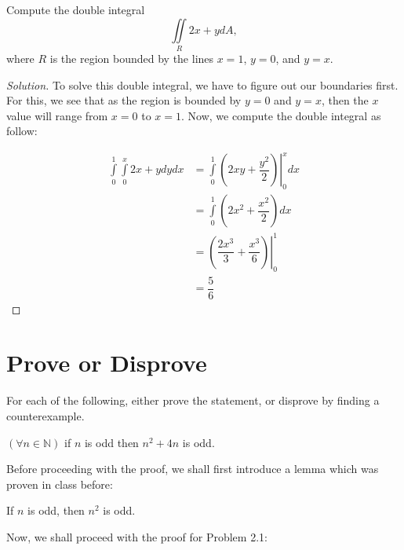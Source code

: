 \documentclass{article}
\newenvironment{solution}{\begin{proof}[Solution]}{\end{proof}}
\newcommand*{\eval}[3]{\left.#1\right\rvert_{#2}^{#3}}
\newcommand{\all}{\forall}
\newcommand{\NN}{\mathbb{N}}
\let\oldint\int
\renewcommand{\int}[2]{\oldint\limits_{#1}^{#2}}
\begin{document}
\newpage

\begin{hw}
	Compute the double integral
	\begin{equation*}
		\iint\limits_R 2x + y dA,
	\end{equation*}
	where $R$ is the region bounded by the lines $ x = 1 $, $ y = 0 $, and $ y = x $.
\end{hw}
\begin{solution}
	To solve this double integral, we have to figure out our boundaries first. For this, we see that as the region is bounded by $y=0$ and $y=x$, then the $x$ value will range from $x=0$ to $x=1$. Now, we compute the double integral as follow:
	
	\begin{align*}
		\int{0}{1} \int{0}{x} 2x + y dydx &= \int{0}{1} \eval{\left( 2xy + \dfrac{y^{2}}{2} \right)}{0}{x} dx \\
		&= \int{0}{1} \left( 2x^{2} + \dfrac{x^{2}}{2} \right) dx \\
		&= \eval{\left( \dfrac{2x^{3}}{3} + \dfrac{x^{3}}{6} \right)}{0}{1} \\
		&= \dfrac{5}{6}
	\end{align*}
\end{solution}

\newpage

\section{Prove or Disprove}
For each of the following, either prove the statement, or disprove by finding a counterexample.
\begin{hw}
	$\left( \all n \in \NN \right)$ if $ n $ is odd then $ n^{2} + 4n $ is odd.
\end{hw}
Before proceeding with the proof, we shall first introduce a lemma which was proven in class before:
\begin{lem}
	If $n$ is odd, then $n^{2}$ is odd.
\end{lem}

Now, we shall proceed with the proof for Problem 2.1:
\end{document}
